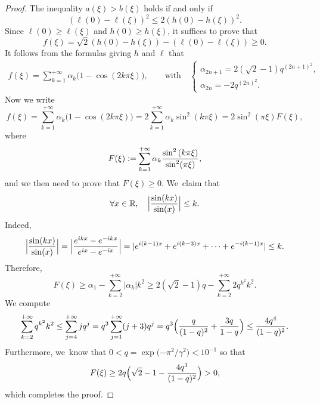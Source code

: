 \documentclass[10pt]{amsart}
\theoremstyle{definition}
\let\EE\exp
\let\dis\relax
\newcommand\R{\mathbb R}
\newcommand{\pa}[1]{\left(#1\right)}
\newcommand{\Bpa}[1]{\Bigl(#1\Bigr)}
\newcommand{\Babs}[1]{\Bigl|#1\Bigr|}
\begin{document}
\begin{proof} The inequality $a(\xi) > b(\xi)$ holds if and only if
\[
\pa{\ell(0) - \ell(\xi)}^2 \leq 2\pa{h(0)-h(\xi)}^2.
\]
Since $\ell(0) \geq \ell(\xi)$ and $h(0) \geq h(\xi)$, it suffices to prove that
\[
f(\xi) = \sqrt{2}\pa{h(0)-h(\xi)}-\pa{\ell(0) - \ell(\xi)} \geq 0.
\]
It follows from the formulas giving $h$ and $\ell$ that
\begin{align*}
f(\xi) = \sum_{k=1}^{+\infty}\alpha_k\bigl(1-\cos({2k\pi\xi})\bigr), \qquad \text{with} \quad
\begin{cases} \alpha_{2n+1} =2(\sqrt{2}-1)q^{(2n+1)^2}, \\[6pt] \alpha_{2n} = - 2q^{(2n)^2}. \end{cases}
\end{align*}
Now we write
\begin{equation*}
f(\xi) = \sum_{k=1}^{+\infty}\alpha_k\bigl(1-\cos({2k\pi\xi})\bigr) = 2 \sum_{k=1}^{+\infty}\alpha_k\sin^2\pa{{k\pi\xi}}
= 2\sin^2({\pi\xi}) F(\xi),
\end{equation*}
where
\[
\dis F(\xi): = \sum_{k=1}^{+\infty}\alpha_k\frac{\sin^2\pa{{k\pi\xi}}}{\sin^2({\pi\xi})},
\]
and we then need to prove that $F(\xi) \geq 0$. We~claim that
\[
\forall x \in \R, \quad \Babs{\frac{\sin(kx)}{\sin(x)}} \leq k.
\]
Indeed,
\[
\Babs{\frac{\sin(kx)}{\sin(x)}} = \Babs{\frac{e^{ikx}-e^{-ikx}}{e^{ix}-e^{-ix}}} = |e^{i(k-1)x} + e^{i(k-3)x} + \dots + e^{-i(k-1)x}| \leq k.
\]
Therefore,
\[
F(\xi) \geq \alpha_1 - \sum_{k=2}^{+\infty} |\alpha_k|k^2 \geq 2(\sqrt{2}-1)q- \sum_{k=2}^{+\infty}2q^{k^2}k^2.
\]
We compute
\[
\sum_{k=2}^{+\infty}q^{k^2}k^2 \leq \sum_{j=4}^{+\infty}jq^{j} = q^3\sum_{j=1}^{+\infty}(j+3)q^j = q^3\Bpa{\frac{q}{(1-q)^2}+\frac{3q}{1-q}} \leq \frac{4q^4}{(1-q)^2}.
\]
Furthermore, we~know that $0 < q = \EE\bigl({-{\pi^2}/{\gamma^2}}\bigr) < 10^{-1}$ so that
\[
F(\xi) \geq 2q\Bpa{\sqrt{2}-1 - \frac{4q^3}{(1-q)^2}} > 0,
\]
which completes the proof.
\end{proof}
\end{document}
